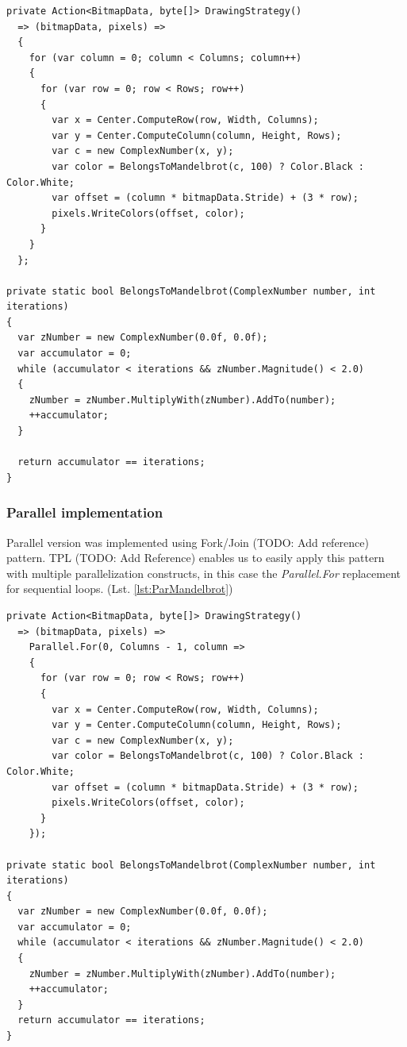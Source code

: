 \begin{lstlisting}[style=sharpcstyle, caption={Sequential Mandelbrot algorithm}, label={lst:SeqMandelbrot}]
private Action<BitmapData, byte[]> DrawingStrategy()
  => (bitmapData, pixels) =>
  {
    for (var column = 0; column < Columns; column++) 
    {
      for (var row = 0; row < Rows; row++) 
      {
        var x = Center.ComputeRow(row, Width, Columns); 
        var y = Center.ComputeColumn(column, Height, Rows); 
        var c = new ComplexNumber(x, y);
        var color = BelongsToMandelbrot(c, 100) ? Color.Black : Color.White; 
        var offset = (column * bitmapData.Stride) + (3 * row);
        pixels.WriteColors(offset, color);
      }
    }
  };

private static bool BelongsToMandelbrot(ComplexNumber number, int iterations)
{
  var zNumber = new ComplexNumber(0.0f, 0.0f);
  var accumulator = 0;
  while (accumulator < iterations && zNumber.Magnitude() < 2.0)
  {
    zNumber = zNumber.MultiplyWith(zNumber).AddTo(number);
    ++accumulator;
  }

  return accumulator == iterations;
}
\end{lstlisting}

\subsubsection{Parallel implementation}
Parallel version was implemented using Fork/Join (TODO: Add reference) pattern. TPL (TODO: Add Reference) enables us to easily apply this pattern with multiple parallelization constructs, in this case the \emph{Parallel.For} replacement for sequential loops. (Lst. \ref{lst:ParMandelbrot})

\begin{lstlisting}[style=sharpcstyle, caption={Parallel Mandelbrot algorithm}, label={lst:ParMandelbrot}]
private Action<BitmapData, byte[]> DrawingStrategy()
  => (bitmapData, pixels) =>
    Parallel.For(0, Columns - 1, column =>
    {
      for (var row = 0; row < Rows; row++)
      {
        var x = Center.ComputeRow(row, Width, Columns);
        var y = Center.ComputeColumn(column, Height, Rows);
        var c = new ComplexNumber(x, y);
        var color = BelongsToMandelbrot(c, 100) ? Color.Black : Color.White;
        var offset = (column * bitmapData.Stride) + (3 * row);
        pixels.WriteColors(offset, color);
      }
    });

private static bool BelongsToMandelbrot(ComplexNumber number, int iterations)
{
  var zNumber = new ComplexNumber(0.0f, 0.0f);
  var accumulator = 0;
  while (accumulator < iterations && zNumber.Magnitude() < 2.0)
  {
    zNumber = zNumber.MultiplyWith(zNumber).AddTo(number);
    ++accumulator;
  }
  return accumulator == iterations;
}
\end{lstlisting}

